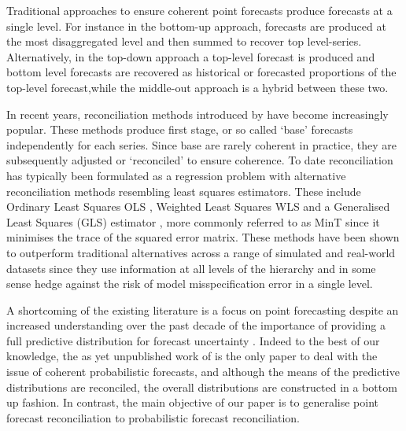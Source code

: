 \documentclass[a4paper, 11pt]{article}
\theoremstyle{theo}
\theoremstyle{definition}
\begin{document}
Traditional approaches to ensure coherent point forecasts produce forecasts at a single level. For instance in the bottom-up \citep{Dunn1976} approach, forecasts are produced at the most disaggregated level and then summed to recover top level-series.  Alternatively, in the top-down approach \citep{Gross1990} a top-level forecast is produced and bottom level forecasts are recovered as  historical or forecasted proportions of the top-level forecast,while the middle-out approach is a hybrid between these two.

In recent years, reconciliation methods introduced by \citet{Hyndman2011} have become increasingly popular.  These methods produce first stage, or  so called `base' forecasts independently for each series.  Since base are rarely coherent in practice,  they are subsequently adjusted  or `reconciled' to ensure coherence.  To  date reconciliation has typically been formulated as a regression problem with alternative reconciliation methods resembling least squares estimators. These include Ordinary Least Squares {OLS} \cite{Hyndman2011}, Weighted Least Squares {WLS}  and a Generalised Least Squares (GLS) estimator \citep{Wickramasuriya2017}, more commonly referred to as MinT since it minimises the trace of  the squared error matrix. These methods have been shown to outperform traditional alternatives across a range of simulated and real-world datasets \citep{Hyndman2011,VanErven2015a,Wickramasuriya2017} since they use information at all levels of the hierarchy and in some sense hedge against the risk of model misspecification error in a single level.

A shortcoming of the existing literature is a focus on point forecasting despite an increased understanding over the past decade of the importance of providing a full predictive distribution for forecast uncertainty \cite[see][and references therein]{Gneiting2014}.  Indeed to the best of our knowledge, the as yet unpublished work of \cite{BenTaieb2017} is the only paper to deal with the issue of coherent probabilistic forecasts, and although the means of the predictive distributions are reconciled, the overall distributions are constructed in a bottom up fashion.  In contrast, the main objective of our paper is to generalise point forecast reconciliation to probabilistic forecast reconciliation.  
\end{document}
